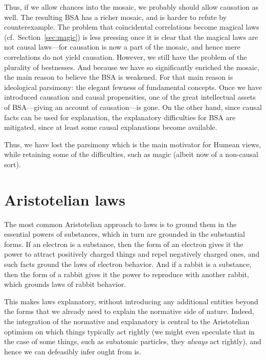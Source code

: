 Thus, if we allow chances into the mosaic, we probably should allow causation as well. The resulting BSA has a richer
mosaic, and is harder to refute by counterexample. The problem that coincidental correlations become 
magical laws (cf.\ Section~\ref{sec:magic}) is less pressing once it is clear that the magical laws are not causal laws---for causation is 
now a part of the mosaic, and hence mere correlations do not yield causation. However, we still have the problem of 
the plurality of bestnesses. And because we have so significantly enriched the mosaic, the main reason to believe the
BSA is weakened. For that main reason is ideological parsimony: the elegant fewness of fundamental concepts. Once we 
have introduced causation and causal propensities, one of the great intellectual assets of BSA---giving
an account of causation---is gone. On the other hand, since causal facts can be used for explanation, the explanatory difficulties for BSA are mitigated, since at least some causal explanations become available.

Thus, we have lost the parsimony which is the main motivator for Humean views, while retaining some of the 
difficulties, such as magic (albeit now of a non-causal sort).

\section{Aristotelian laws}
The most common Aristotelian approach to laws is to ground them in the essential powers of substances, which in turn are
grounded in the substantial forms. If an electron is a substance, then the form of an electron gives it the power to attract positively 
charged things and repel negatively charged ones, and such facts ground the laws of electron behavior. And if a rabbit is 
a substance, then the form of a rabbit gives it the power to reproduce with another rabbit, which grounds laws of rabbit
behavior. 

This makes laws explanatory, without introducing any additional entities beyond the forms that we already need to explain
the normative side of nature. Indeed, the integration of the normative and explanatory is central to the Aristotelian
optimism on which things typically act rightly (we might even speculate that in the case of some things, such as 
subatomic particles, they \textit{always} act rightly), and hence we can defeasibly infer ought from is.

